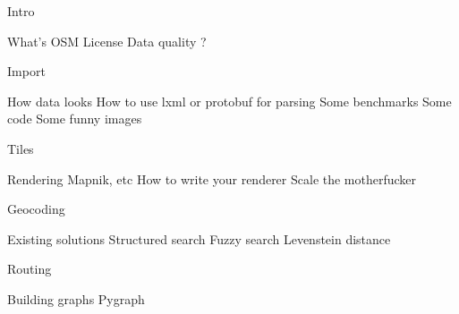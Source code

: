 \documentclass{beamer}
\begin{document}
Intro

What's OSM
License
Data quality ?

Import

How data looks
How to use lxml or protobuf for parsing
Some benchmarks
Some code
Some funny images

Tiles

Rendering
Mapnik, etc
How to write your renderer
Scale the motherfucker

Geocoding

Existing solutions
Structured search
Fuzzy search
Levenstein distance

Routing

Building graphs
Pygraph
\end{document}
